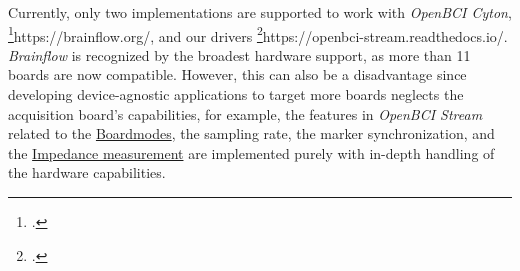 Currently, only two implementations are supported to work with \textit{OpenBCI Cyton}, \footcite{BrainFlow}{https://brainflow.org/}, and our drivers \footcite{OpenBCI Stream}{https://openbci-stream.readthedocs.io/}. \textit{Brainflow} is recognized by the broadest hardware support, as more than 11 boards are now compatible. However, this can also be a disadvantage since developing device-agnostic applications to target more boards neglects the acquisition board’s capabilities, for example, the features in \textit{OpenBCI Stream} related to the \hyperref[subsec:boardmodes]{Boardmodes}, the sampling rate, the marker synchronization, and the \hyperref[subsec:impedance-measurement]{Impedance measurement} are implemented purely with in-depth handling of the hardware capabilities.


